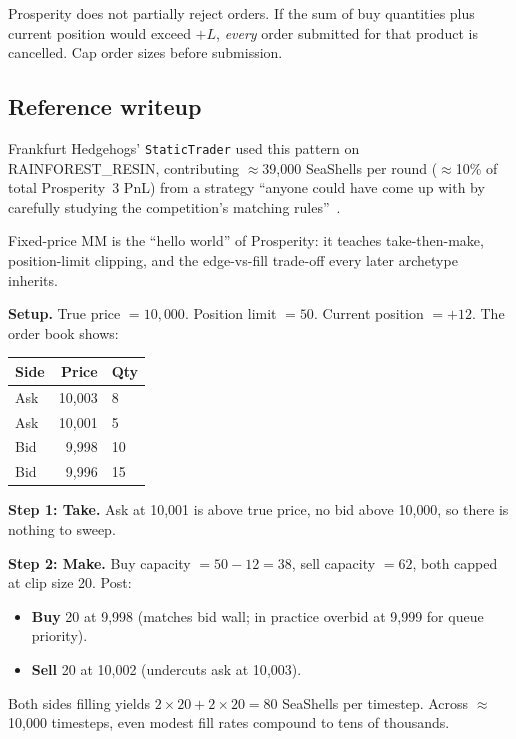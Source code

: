 \begin{pitfallbox}
Prosperity does not partially reject orders.  If the sum of buy
quantities plus current position would exceed $+L$, \emph{every}
order submitted for that product is cancelled.  Cap order sizes
before submission.
\end{pitfallbox}

\subsection{Reference writeup}

Frankfurt Hedgehogs' \texttt{StaticTrader} used this pattern on
RAINFOREST\_RESIN, contributing $\approx$39{,}000 SeaShells per
round ($\approx$10\% of total Prosperity~3 PnL) from a strategy
``anyone could have come up with by carefully studying the
competition's matching rules''~\citep{frankfurthedgehogs2025}.

\begin{intuitionbox}
Fixed-price MM is the ``hello world'' of Prosperity: it teaches
take-then-make, position-limit clipping, and the edge-vs-fill
trade-off every later archetype inherits.
\end{intuitionbox}

\begin{prosperitybox}[title={RAINFOREST\_RESIN worked example}]
\textbf{Setup.}  True price $= 10{,}000$.  Position limit $= 50$.
Current position $= +12$.  The order book shows:

\medskip
\begin{tabular}{lrl}
\toprule
\textbf{Side} & \textbf{Price} & \textbf{Qty} \\
\midrule
Ask & 10{,}003 & 8 \\
Ask & 10{,}001 & 5 \\
Bid & 9{,}998  & 10 \\
Bid & 9{,}996  & 15 \\
\bottomrule
\end{tabular}
\medskip

\textbf{Step 1: Take.}  Ask at 10{,}001 is above true price, no bid
above 10{,}000, so there is nothing to sweep.

\textbf{Step 2: Make.}  Buy capacity $= 50 - 12 = 38$, sell capacity
$= 62$, both capped at clip size 20.  Post:
\begin{itemize}
  \item \textbf{Buy} 20 at 9{,}998 (matches bid wall; in practice
  overbid at 9{,}999 for queue priority).
  \item \textbf{Sell} 20 at 10{,}002 (undercuts ask at 10{,}003).
\end{itemize}
Both sides filling yields $2\times20 + 2\times20 = 80$ SeaShells per
timestep.  Across $\approx$10{,}000 timesteps, even modest fill rates
compound to tens of thousands.
\end{prosperitybox}

